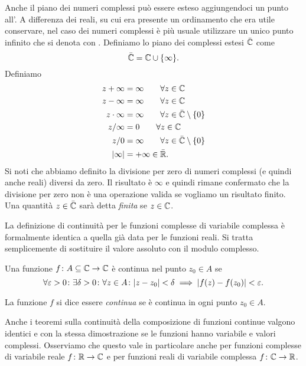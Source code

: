 Anche il piano dei numeri complessi può essere esteso aggiungendoci
un punto all'.
A differenza dei reali, su cui era presente un ordinamento che era utile conservare,
nel caso dei numeri complessi è più usuale utilizzare un unico punto infinito
che si denota con \myemph{$\infty$}.
Definiamo lo piano dei complessi estesi $\bar {\mathbb C}$ come
\[
\bar {\mathbb C} = \mathbb C \cup {\left\{ \infty \right\}}.
\]
Definiamo
\begin{align*}
  z + \infty &= \infty \qquad \forall z \in \mathbb C\\
  z - \infty &= \infty \qquad \forall z \in \mathbb C\\
   z\cdot \infty &= \infty \qquad \forall z \in \bar{\mathbb C}\setminus{\left\{ 0 \right\}} \\
   z / \infty &= 0 \qquad \forall z \in \mathbb C \\
   z / 0 &= \infty \qquad \forall z \in \bar {\mathbb C} \setminus{\left\{ 0 \right\}}\\
   {\left|\infty\right|} &= +\infty \in \bar {\mathbb R}.
\end{align*}
Si noti che abbiamo definito la divisione per zero di numeri complessi
(e quindi anche reali) diversi da zero. Il risultato è $\infty$ e quindi
rimane confermato che la divisione per zero non è una operazione valida
se vogliamo un risultato finito.
Una quantità $z\in \bar {\mathbb C}$ sarà detta \emph{finita} se $z\in \mathbb C$.

La definizione di continuità per le funzioni complesse di variabile complessa
è formalmente identica a quella già data per le funzioni reali.
Si tratta semplicemente di sostituire il valore assoluto con il modulo complesso.
%
\begin{definition}[continuità in $\CC$]
Una funzione $f\colon A \subseteq \mathbb C \to \mathbb C$ è
continua nel punto $z_0\in A$ se
\[
\forall \varepsilon>0\colon \exists \delta>0 \colon \forall z\in A\colon
{\left|z-z_0\right|}<\delta \implies {\left|f(z)-f(z_0)\right|} < \varepsilon.
\]

La funzione $f$ si dice essere \emph{continua} se
è continua in ogni punto $z_0\in A$.
\end{definition}

Anche i teoremi sulla continuità della composizione di funzioni
continue valgono identici e con la stessa dimostrazione
se le funzioni hanno variabile e valori complessi.
Osserviamo che questo vale
in particolare anche per funzioni complesse di variabile reale
$f\colon \mathbb R\to \mathbb C$ e per funzioni reali di variabile complessa
$f\colon \mathbb C \to \mathbb R$.

